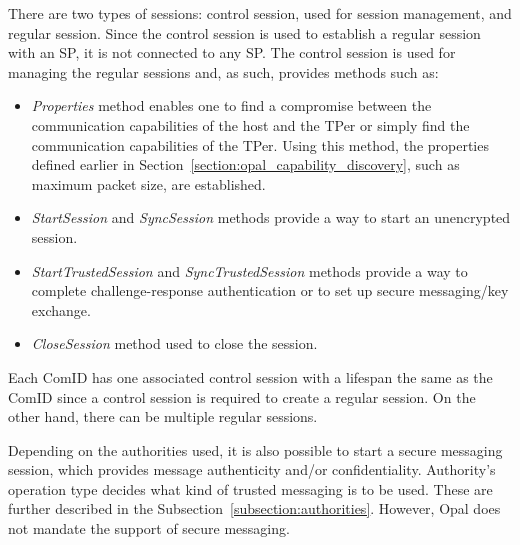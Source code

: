 There are two types of sessions: control session, used for session management, and regular session.
Since the control session is used to establish a regular session with an SP, it is not connected to any SP. The control session is used for managing the regular sessions and, as such, provides methods such as:
\begin{itemize}
\item \emph{Properties} method enables one to find a compromise between the communication capabilities of the host and the TPer or simply find the communication capabilities of the TPer. Using this method, the properties defined earlier in Section~\ref{section:opal_capability_discovery}, such as maximum packet size, are established.
\item \emph{StartSession} and \emph{SyncSession} methods provide a way to start an unencrypted session.
\item \emph{StartTrustedSession} and \emph{SyncTrustedSession} methods provide a way to complete challenge-response authentication or to set up secure messaging/key exchange.
\item \emph{CloseSession} method used to close the session.
\end{itemize}
Each ComID has one associated control session with a lifespan the same as the ComID since a control session is required to create a regular session. On the other hand, there can be multiple regular sessions.



Depending on the authorities used, it is also possible to start a secure messaging session, which provides message authenticity and/or confidentiality.
Authority's operation type decides what kind of trusted messaging is to be used. These are further described in the Subsection~\ref{subsection:authorities}. 
However, Opal does not mandate the support of secure messaging.



